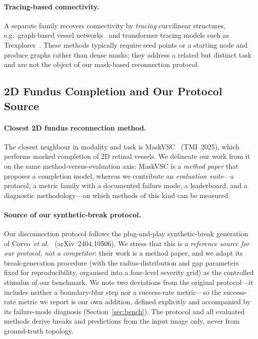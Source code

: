 \paragraph{Tracing-based connectivity.}
A separate family recovers connectivity by \emph{tracing} curvilinear structures,
e.g.\ graph-based vessel networks~\cite{key:vgn} and transformer tracing models
such as Trexplorer~\cite{key:trexplorer}. These methods typically require seed
points or a starting node and produce graphs rather than dense masks; they
address a related but distinct task and are not the object of our mask-based
reconnection protocol.

\subsection{2D Fundus Completion and Our Protocol Source}
\label{sec:related:fundus}

\paragraph{Closest 2D fundus reconnection method.}
The closest neighbour in modality and task is MaskVSC~\cite{key:maskvsc}
(TMI~2025), which performs masked completion of 2D retinal vessels. We delineate
our work from it on the same method-versus-evaluation axis: MaskVSC is a
\emph{method paper} that proposes a completion model, whereas we contribute an
\emph{evaluation suite}---a protocol, a metric family with a documented failure
mode, a leaderboard, and a diagnostic methodology---on which methods of this kind
can be measured.

\paragraph{Source of our synthetic-break protocol.}
Our disconnection protocol follows the plug-and-play synthetic-break generation
of Corvo~\emph{et al.}~\cite{key:creatis} (arXiv~2404.10506). We stress that this
is a \emph{reference source for our protocol, not a competitor}: their work is a
method paper, and we adapt its break-generation procedure (with the
radius-distribution and gap parameters fixed for reproducibility, organised into
a four-level severity grid) as the controlled stimulus of our benchmark. We note
two deviations from the original protocol---it includes neither a boundary-blur
step nor a success-rate metric---so the success-rate metric we report is our own
addition, defined explicitly and accompanied by its failure-mode diagnosis
(Section~\ref{sec:bench}). The protocol and all evaluated methods derive breaks
and predictions from the input image only, never from ground-truth topology.

